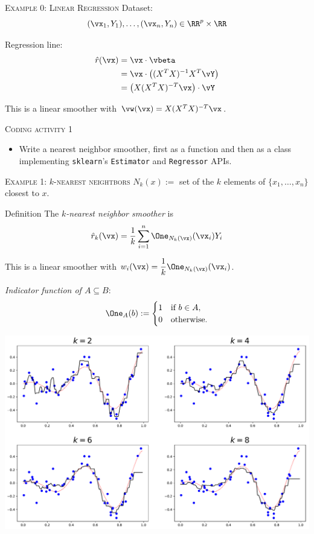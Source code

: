 \documentclass{beamer}
\begin{document}
\begin{frame}{\textsc{Example 0: Linear Regression}}
    Dataset:
    \[
        (\vx_1, Y_1),\ldots,(\vx_n, Y_n)\in\RR^p\times \RR
    \]

    Regression line:
    \begin{align*}
        \hat r(\vx) &= \vx\cdot\vbeta\\
        &= \vx\cdot \big((X^TX)^{-1}X^T\vY\big)\\
        &=\big(X(X^TX)^{-T}\vx\big)\cdot\vY
    \end{align*}

    This is a linear smoother with $\vw(\vx) = X(X^TX)^{-T}\vx$.
\end{frame}

\begin{frame}{\textsc{Coding activity 1}}

    \begin{itemize}
        \item Write a nearest neighbor smoother, first as a function and then 
        as a class implementing \texttt{sklearn}'s \texttt{Estimator} and \texttt{Regressor} APIs.
    \end{itemize}
\end{frame}

\begin{frame}{\textsc{Example 1: $k$-nearest neightbors}}
    $N_k(x) :=$ set of the $k$ elements of $\{x_1,\ldots,x_n\}$ closest to $x$.

    \begin{block}{Definition}
    The \emph{$k$-nearest neighbor smoother} is
    \[
        \hat r_k(\vx) = \frac1k\sum_{i=1}^n \One_{N_k(\vx)}(\vx_i)Y_i
    \]
    \end{block}
    This is a linear smoother with $w_i(\vx)=\dfrac1k\One_{N_k(\vx)}(\vx_i)$.

        \emph{Indicator function of $A\subseteq B$}:
        \[
            \One_A(b) := \begin{cases}
                1&\text{if $b\in A$},\\
                0&\text{otherwise.}
            \end{cases}
        \]
\end{frame}


\begin{frame}{}%
    \includegraphics[scale=0.36]{knn_four_plots_1.pdf}
\end{frame}
\end{document}

